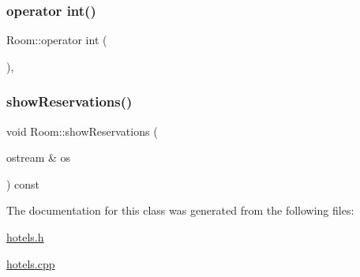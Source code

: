 \mbox{\label{class_room_a41563a17c78b8dcebaaae4d07dd3537c}} 
\subsubsection{\texorpdfstring{operator int()}{operator int()}}
{\footnotesize\ttfamily Room\+::operator int (\begin{DoxyParamCaption}{ }\end{DoxyParamCaption})\hspace{0.3cm}{\ttfamily [inline]}, {\ttfamily [explicit]}}

\mbox{\label{class_room_af606f87948de7df87296b3c720500cb7}} 
\subsubsection{\texorpdfstring{show\+Reservations()}{showReservations()}}
{\footnotesize\ttfamily void Room\+::show\+Reservations (\begin{DoxyParamCaption}\item[{ostream \&}]{os }\end{DoxyParamCaption}) const\hspace{0.3cm}{\ttfamily [inline]}}



The documentation for this class was generated from the following files\+:\begin{DoxyCompactItemize}
\item 
\hyperlink{hotels_8h}{hotels.\+h}\item 
\hyperlink{hotels_8cpp}{hotels.\+cpp}\end{DoxyCompactItemize}
